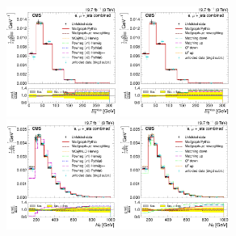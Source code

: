 \begin{figure}[hbtp]
    \centering
     \includegraphics[width=0.32\textwidth]{Chapters/07_08_09_Analysis/Images/results/fit/8TeV/MET/central/normalised_xsection_combined_different_generators_with_bkgd_subtraction_results.pdf}\hfill
     \includegraphics[width=0.32\textwidth]{Chapters/07_08_09_Analysis/Images/results/fit/8TeV/MET/central/normalised_xsection_combined_systematics_shifts_with_bkgd_subtraction_results.pdf}\\
     \includegraphics[width=0.32\textwidth]{Chapters/07_08_09_Analysis/Images/results/fit/8TeV/HT/central/normalised_xsection_combined_different_generators_with_bkgd_subtraction_results.pdf}\hfill
     \includegraphics[width=0.32\textwidth]{Chapters/07_08_09_Analysis/Images/results/fit/8TeV/HT/central/normalised_xsection_combined_systematics_shifts_with_bkgd_subtraction_results.pdf}\\

\end{figure}
